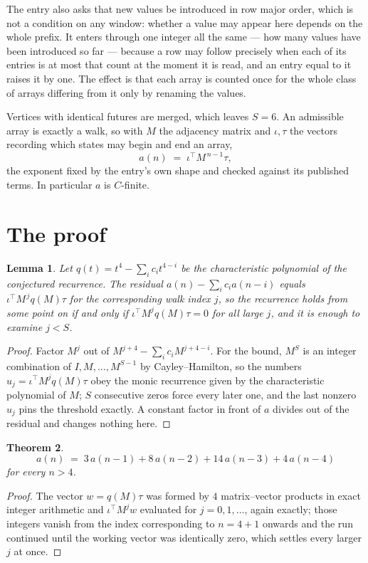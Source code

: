 \documentclass[11pt,a4paper]{article}
\theoremstyle{plain}
\newtheorem{theorem}{Theorem}
\newtheorem{lemma}[theorem]{Lemma}
\theoremstyle{definition}
\begin{document}
The entry also asks that new values be introduced in row major order, which is not a condition on any window: whether a value may appear here depends on the whole prefix. It enters through one integer all the same --- how many values have been introduced so far --- because a row may follow precisely when each of its entries is at most that count at the moment it is read, and an entry equal to it raises it by one. The effect is that each array is counted once for the whole class of arrays differing from it only by renaming the values.

Vertices with identical futures are merged, which leaves $S=6$. An admissible array is exactly a walk, so with $M$ the adjacency matrix and $\iota,\tau$ the vectors recording which states may begin and end an array,
\[
a(n)\;=\;\iota^{\!\top}M^{\,n-1}\tau ,
\]
the exponent fixed by the entry's own shape and checked against its published terms. In
particular $a$ is $C$-finite.

\section{The proof}

\begin{lemma}\label{lem:crit}
Let $q(t)=t^{4}-\sum_i c_it^{4-i}$ be the characteristic polynomial of the
conjectured recurrence. The residual $a(n)-\sum_ic_ia(n-i)$ equals
$\iota^{\!\top}M^{\,j}q(M)\tau$ for the corresponding walk index $j$, so the recurrence
holds from some point on if and only if $\iota^{\!\top}M^{j}q(M)\tau=0$ for all large $j$,
and it is enough to examine $j<S$.
\end{lemma}

\begin{proof}
Factor $M^{j}$ out of $M^{j+4}-\sum_ic_iM^{j+4-i}$. For the bound, $M^{S}$
is an integer combination of $I,M,\dots,M^{S-1}$ by Cayley--Hamilton, so the numbers
$u_j=\iota^{\!\top}M^{j}q(M)\tau$ obey the monic recurrence given by the characteristic
polynomial of $M$; $S$ consecutive zeros force every later one, and the last nonzero $u_j$
pins the threshold exactly. A constant factor in front of $a$ divides out of the residual and
changes nothing here.
\end{proof}

\begin{theorem}
\[
a(n)\;=\;3\,a(n-1) + 8\,a(n-2) + 14\,a(n-3) + 4\,a(n-4)
\]
for every $n>4$.
\end{theorem}

\begin{proof}
The vector $w=q(M)\tau$ was formed by $4$ matrix--vector products in exact integer
arithmetic and $\iota^{\!\top}M^{j}w$ evaluated for $j=0,1,\dots$, again exactly; those
integers vanish from the index corresponding to $n=4+1$ onwards and the run continued
until the working vector was identically zero, which settles every larger $j$ at once.
\end{proof}
\end{document}
